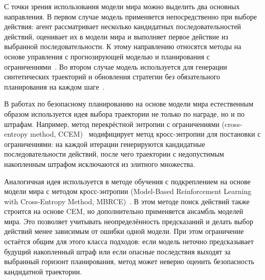 С точки зрения использования модели мира можно выделить два основных направления. В первом случае модель применяется непосредственно при выборе действия: агент рассматривает несколько кандидатных последовательностей действий, оценивает их в модели мира и выполняет первое действие из выбранной последовательности. К этому направлению относятся методы на основе управления с прогнозирующей моделью и планирования с ограничениями~\cite{camacho2007model,koller2018learning,wabersich2021predictive,liu2020mbrce,wen2018cce}. Во втором случае модель используется для генерации синтетических траекторий и обновления стратегии без обязательного планирования на каждом шаге~\cite{hafner2019dreamer,jayant2022model,thomas2021safe}.

В работах по безопасному планированию на основе модели мира естественным образом используется идея выбора траектории не только по награде, но и по штрафам. Например, метод перекрёстной энтропии с ограничениями (cross-entropy method, CCEM)~\cite{wen2018cce} модифицирует метод кросс-энтропии для постановки с ограничениями: на каждой итерации генерируются кандидатные последовательности действий, после чего траектории с недопустимым накопленным штрафом исключаются из элитного множества.

Аналогичная идея используется в методе обучения с подкреплением на основе модели мира с методом кросс-энтропии (Model-Based Reinforcement Learning with Cross-Entropy Method, MBRCE)~\cite{liu2020mbrce}. В этом методе поиск действий также строится на основе CEM, но дополнительно применяется ансамбль моделей мира. Это позволяет учитывать неопределённость предсказаний и делать выбор действий менее зависимым от ошибки одной модели. При этом ограничение остаётся общим для этого класса подходов: если модель неточно предсказывает будущий накопленный штраф или если опасные последствия выходят за выбранный горизонт планирования, метод может неверно оценить безопасность кандидатной траектории.

